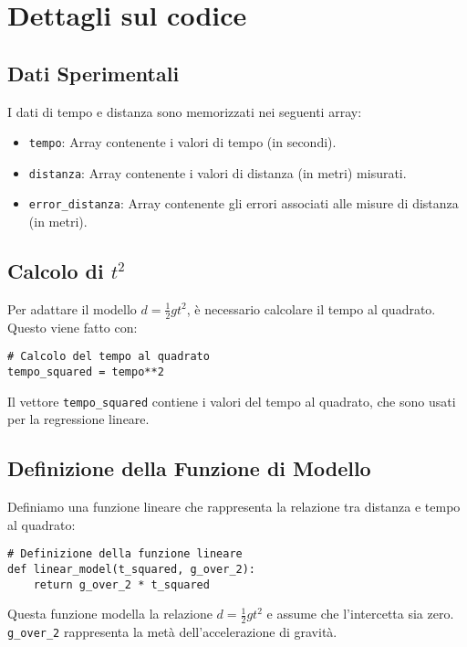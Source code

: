 \section{Dettagli sul codice}

\subsection{Dati Sperimentali}
I dati di tempo e distanza sono memorizzati nei seguenti array:

\begin{itemize}
    \item \texttt{tempo}: Array contenente i valori di tempo (in secondi).
    \item \texttt{distanza}: Array contenente i valori di distanza (in metri) misurati.
    \item \texttt{error\_distanza}: Array contenente gli errori associati alle misure di distanza (in metri).
\end{itemize}

\subsection{Calcolo di \( t^2 \)}
Per adattare il modello \( d = \frac{1}{2} g t^2 \), è necessario calcolare il tempo al quadrato. Questo viene fatto con:

\begin{lstlisting}
# Calcolo del tempo al quadrato
tempo_squared = tempo**2
\end{lstlisting}

Il vettore \texttt{tempo\_squared} contiene i valori del tempo al quadrato, che sono usati per la regressione lineare.

\subsection{Definizione della Funzione di Modello}
Definiamo una funzione lineare che rappresenta la relazione tra distanza e tempo al quadrato:

\begin{lstlisting}
# Definizione della funzione lineare
def linear_model(t_squared, g_over_2):
    return g_over_2 * t_squared
\end{lstlisting}

Questa funzione modella la relazione \( d = \frac{1}{2} g t^2 \) e assume che l'intercetta sia zero. \texttt{g\_over\_2} rappresenta la metà dell'accelerazione di gravità.

